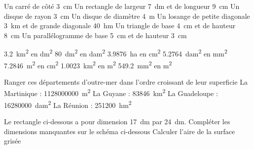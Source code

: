 \documentclass[../Cours.tex]{subfiles}
\begin{document}
\begin{questions}
        \question Un carré de côté \qty{3}{cm}
        \question Un rectangle de largeur \qty{7}{dm} et de longueur \qty{9}{cm}
        \question Un disque de rayon \qty{3}{cm}
        \question Un disque de diamètre \qty{4}{m}
        \question Un losange de petite diagonale \qty{3}{km} et de grande diagonale \qty{40}{hm}
        \question Un triangle de base \qty{4}{cm} et de hauteur \qty{8}{cm}
        \question Un parallélogramme de base \qty{5}{\centi\metre} et de hauteur \qty{3}{\centi\metre}
        
        \question \qty{3,2}{km\squared} en \unit{dm\squared}
        \question \qty{80}{dm\squared} en \unit{dam\squared}
        \question \qty{3,9876}{ha} en \unit {cm\squared}
        \question \qty{5,2764}{dam\squared} en \unit{mm\squared}
        \question \qty{7,2846}{m\squared} en \unit {cm\squared}
        \question \qty{1,0023}{km\squared} en \unit{m\squared}
        \question \qty{549.2}{mm\squared} en \unit{m\squared}
        
    \exercice Ranger ces départements d'outre-mer dans l'ordre croissant de leur superficie
        \question La Martinique : \qty{1128000000}{m\squared}
        \question La Guyane : \qty{83846}{km\squared}
        \question La Guadeloupe : \qty{16280000}{dam\squared}
        \question La Réunion : \qty{251200}{hm\squared}
        
    \exercice
        Le rectangle ci-dessous a pour dimension \qty{17}{dm} par \qty{24}{dm}.
        \question Compléter les dimensions manquantes sur le schéma ci-dessous
        \question Calculer l'aire de la surface grisée
        
        \begin{center}
\end{center}
\end{questions}
\end{document}
